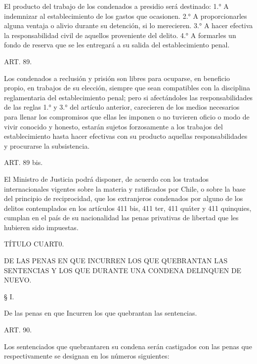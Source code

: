     El producto del trabajo de los condenados a presidio será destinado:
    1.° A indemnizar al establecimiento de los gastos que ocasionen.
    2.° A proporcionarles alguna ventaja o alivio durante su detención, si lo merecieren.
    3.° A hacer efectiva la responsabilidad civil de aquellos proveniente del delito.
    4.° A formarles un fondo de reserva que se les entregará a su salida del establecimiento penal.



    ART. 89.

    Los condenados a reclusión y prisión son libres para ocuparse, en beneficio propio, en trabajos de su elección, siempre que sean compatibles con la disciplina reglamentaria del establecimiento penal; pero si afectándoles las responsabilidades de las reglas 1.° y 3.° del artículo anterior, carecieren de los medios necesarios para llenar los compromisos que ellas les imponen o no tuvieren oficio o modo de vivir conocido y honesto, estarán sujetos forzosamente a los trabajos del establecimiento hasta hacer efectivas con su producto aquellas responsabilidades y procurarse la subsistencia.

    ART. 89 bis.

    El Ministro de Justicia podrá disponer, de acuerdo con los tratados internacionales vigentes sobre la materia y ratificados por Chile, o sobre la base del principio de reciprocidad, que los extranjeros condenados por alguno de los delitos contemplados en los artículos 411 bis, 411 ter, 411 quáter y 411 quinquies, cumplan en el país de su nacionalidad las penas privativas de libertad que les hubieren sido impuestas.   



    TÍTULO CUART0.

    DE LAS PENAS EN QUE INCURREN LOS QUE QUEBRANTAN LAS SENTENCIAS Y LOS QUE DURANTE UNA CONDENA DELINQUEN DE NUEVO.



    § I.

    De las penas en que Incurren los que quebrantan las sentencias.


    ART. 90.

    Los sentenciados que quebrantaren su condena serán castigados con las penas que respectivamente se designan en los números siguientes:

